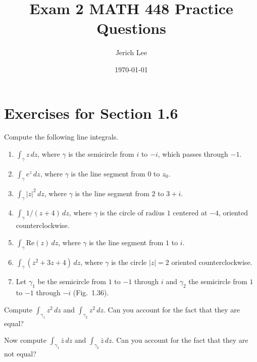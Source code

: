 \documentclass[12pt]{article}
\title{Exam 2 MATH 448 Practice Questions}
\author{Jerich Lee}
\date{\today}
\theoremstyle{definition} %
\theoremstyle{plain} %
\begin{document}
\maketitle
\section*{Exercises for Section 1.6}

Compute the following line integrals.
\begin{enumerate}
    \item $\int_\gamma z \, dz$, where $\gamma$ is the semicircle from $i$ to $-i$, which passes through $-1$.
    \item $\int_\gamma e^z \, dz$, where $\gamma$ is the line segment from $0$ to $z_0$.
    \item $\int_\gamma |z|^2 \, dz$, where $\gamma$ is the line segment from $2$ to $3 + i$.
    \item $\int_\gamma 1/(z + 4) \, dz$, where $\gamma$ is the circle of radius $1$ centered at $-4$, oriented counterclockwise.
    \item $\int_\gamma \text{Re}(z) \, dz$, where $\gamma$ is the line segment from $1$ to $i$.
    \item $\int_\gamma (z^2 + 3z + 4) \, dz$, where $\gamma$ is the circle $|z| = 2$ oriented counterclockwise.
    \item Let $\gamma_1$ be the semicircle from $1$ to $-1$ through $i$ and $\gamma_2$ the semicircle from $1$ to $-1$ through $-i$ (Fig.\ 1.36).
\end{enumerate}


Compute $\int_{\gamma_1} z^2 \, dz$ and $\int_{\gamma_2} z^2 \, dz$. Can you account for the fact that they are equal?

Now compute $\int_{\gamma_1} \bar{z} \, dz$ and $\int_{\gamma_2} \bar{z} \, dz$. Can you account for the fact that they are not equal?
\end{document}
